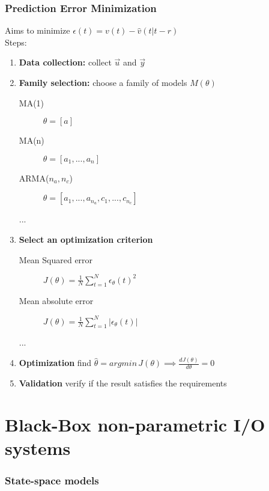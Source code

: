 \documentclass{article}
\begin{document}
\section{Prediction Error Minimization} Aims to minimize $\epsilon(t)=v(t)-\hat{v}(t|t-r)$\\
Steps:
\begin{enumerate}
\item \textbf{Data collection:} collect $\vec{u}$ and $\vec{y}$
\item \textbf{Family selection:} choose a family of models $M(\theta)$
	\begin{description}
	\item[MA(1)] $\theta=[a]$
	\item[MA(n)] $\theta=[a_1,...,a_n]$
	\item[ARMA($n_a,n_c$)] $\theta=[a_1,...,a_{n_a},
	c_1,...,c_{n_c}]$
	\item[...]
	\end{description}
\item \textbf{Select an optimization criterion}
	\begin{description}
	\item[Mean Squared error] $J(\theta)=\frac{1}{N}\sum_{t=1}^N \epsilon_\theta(t)^2$
	\item[Mean absolute error] $J(\theta)=\frac{1}{N}\sum_{t=1}^N |\epsilon_\theta(t)|$
	\item[...]
	\end{description}
\item  \textbf{Optimization} find $\hat{\theta}=argmin\,J(\theta)\implies \frac{dJ(\theta)}{d\theta}=0$
\item \textbf{Validation} verify if the result satisfies the requirements
\end{enumerate}

\newpage
\appendix

\newpage
\part{Black-Box non-parametric I/O systems}
\section{State-space models}
\begin{center}
\end{center}
\end{document}
